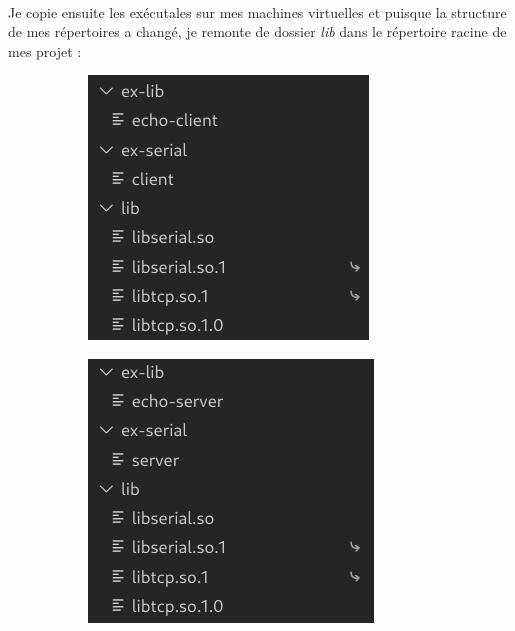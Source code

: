 \documentclass{article}
\begin{document}
    \paragraph{}
    Je copie ensuite les exécutales sur mes machines virtuelles et puisque la structure de mes répertoires a changé, je remonte de dossier \emph{lib} dans le répertoire racine de mes projet :
    \begin{figure}[H]
        \centering
        \begin{subfigure}[b]{.48\textwidth}
            \centering
            \includegraphics[width=.5\textwidth]{./screenshots/client-arbor.png}
        \end{subfigure}
        \begin{subfigure}[b]{.48\textwidth}
            \centering
            \includegraphics[width=.5\textwidth]{./screenshots/server-arbor.png}
        \end{subfigure}
    \end{figure}
\end{document}
